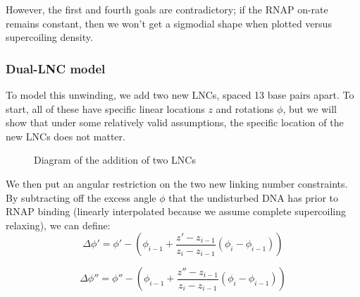 \documentclass[11pt]{article}
\begin{document}
However, the first and fourth goals are contradictory; if the RNAP on-rate remains constant, then we won't get a sigmodial shape when plotted versus supercoiling density. 

\FloatBarrier
\subsubsection{Dual-LNC model}
To model this unwinding, we add two new LNCs, spaced 13 base pairs apart. To start, all of these have specific linear locations \(z\) and rotations \(\phi\), but we will show that under some relatively valid assumptions, the specific location of the new LNCs does not matter.

\begin{figure}[h]
    \centering
    \caption{Diagram of the addition of two LNCs}
    \label{fig:lnc_diagram}
\end{figure}

We then put an angular restriction on the two new linking number constraints. By subtracting off the excess angle \(\phi\) that the undisturbed DNA has prior to RNAP binding (linearly interpolated because we assume complete supercoiling relaxing), we can define:
\begin{equation}
    \Delta \phi' = \phi' - \left(\phi_{i - 1} + \frac{z' - z_{i-1}}{z_i - z_{i-1}} (\phi_i - \phi_{i-1})\right)
\end{equation}

\begin{equation}
    \Delta \phi'' = \phi'' - \left(\phi_{i - 1} + \frac{z'' - z_{i-1}}{z_i - z_{i-1}} (\phi_i - \phi_{i-1})\right)
\end{equation}
\end{document}
